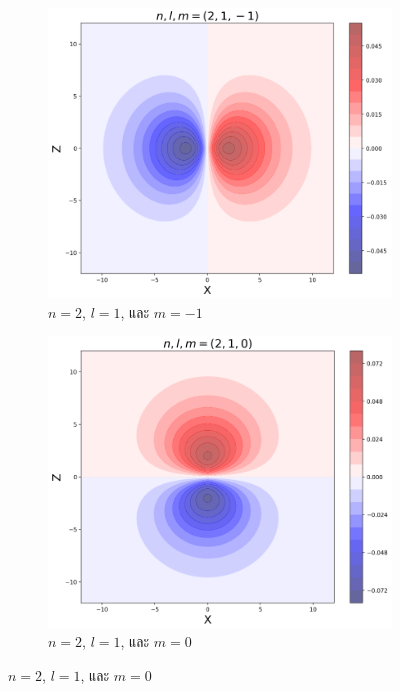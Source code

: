 \begin{figure}[H]
    \\
    \vspace{1em}
    \begin{subfigure}{0.5\textwidth}
        \centering
        \includegraphics[width=0.9\linewidth]{fig/wfn_hydro_n2_l1_m-1.png}
        \caption{$n = 2$, $l = 1$, และ $m = -1$}
        \label{fig:wfn_hydro_n2_l1_m-1}
    \end{subfigure}%
    \begin{subfigure}{0.5\textwidth}
        \centering
        \includegraphics[width=0.9\linewidth]{fig/wfn_hydro_n2_l1_m0.png}
        \caption{$n = 2$, $l = 1$, และ $m = 0$}
        \label{fig:wfn_hydro_n2_l1_m0}
    \end{subfigure}

\end{figure}

